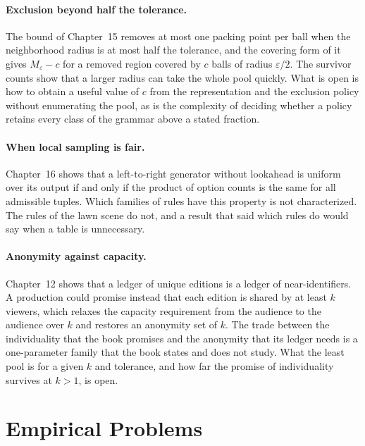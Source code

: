 \documentclass[11pt,twoside,openright]{book}
\theoremstyle{plain}
\theoremstyle{definition}
\theoremstyle{remark}
\begin{document}
\paragraph{Exclusion beyond half the tolerance.} The bound of Chapter~15 removes at most one packing point per ball when the neighborhood radius is at most half the tolerance, and the covering form of it gives $M_\varepsilon-c$ for a removed region covered by $c$ balls of radius $\varepsilon/2$. The survivor counts show that a larger radius can take the whole pool quickly. What is open is how to obtain a useful value of $c$ from the representation and the exclusion policy without enumerating the pool, as is the complexity of deciding whether a policy retains every class of the grammar above a stated fraction.

\paragraph{When local sampling is fair.} Chapter~16 shows that a left-to-right generator without lookahead is uniform over its output if and only if the product of option counts is the same for all admissible tuples. Which families of rules have this property is not characterized. The rules of the lawn scene do not, and a result that said which rules do would say when a table is unnecessary.

\paragraph{Anonymity against capacity.} Chapter~12 shows that a ledger of unique editions is a ledger of near-identifiers. A production could promise instead that each edition is shared by at least $k$ viewers, which relaxes the capacity requirement from the audience to the audience over $k$ and restores an anonymity set of $k$. The trade between the individuality that the book promises and the anonymity that its ledger needs is a one-parameter family that the book states and does not study. What the least pool is for a given $k$ and tolerance, and how far the promise of individuality survives at $k>1$, is open.

\section{Empirical Problems}\label{sec:emp18}
\end{document}
